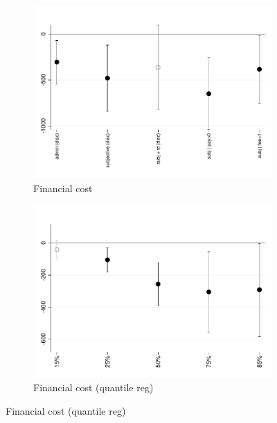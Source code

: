 \documentclass[11pt]{article}
\begin{document}
\begin{figure}[H]
\end{figure}






\begin{figure}[H]
    \caption{The effect of the fee-forcing treatment}
    \label{fc_pro2}
    \begin{center}
    \begin{subfigure}{0.42\textwidth}
        \caption{Financial cost}
        \centering
        \includegraphics[width=\textwidth]{Figuras/fc_te_pro_2.pdf}
    \end{subfigure}
        \begin{subfigure}{0.42\textwidth}
        \caption{Financial cost (quantile reg)}
        \centering
        \includegraphics[width=\textwidth]{Figuras/fc_quantile_pro_2.pdf}
    \end{subfigure}
    

\end{center}
\end{figure}
\end{document}
